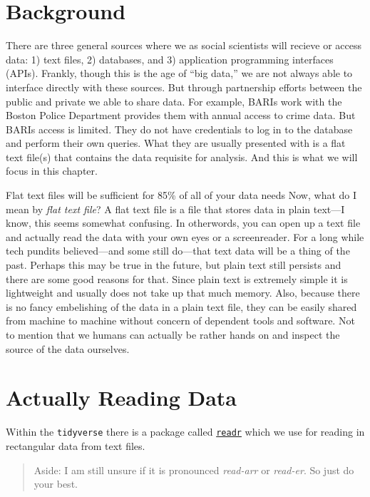 \documentclass[
]{book}
\begin{document}
\hypertarget{background}{%
\section{Background}\label{background}}

There are three general sources where we as social scientists will recieve or access data: 1) text files, 2) databases, and 3) application programming interfaces (APIs). Frankly, though this is the age of ``big data,'' we are not always able to interface directly with these sources. But through partnership efforts between the public and private we able to share data. For example, BARIs work with the Boston Police Department provides them with annual access to crime data. But BARIs access is limited. They do not have credentials to log in to the database and perform their own queries. What they are usually presented with is a flat text file(s) that contains the data requisite for analysis. And this is what we will focus in this chapter.

Flat text files will be sufficient for 85\% of all of your data needs Now, what do I mean by \emph{flat text file}? A flat text file is a file that stores data in plain text---I know, this seems somewhat confusing. In otherwords, you can open up a text file and actually read the data with your own eyes or a screenreader. For a long while tech pundits believed---and some still do---that text data will be a thing of the past. Perhaps this may be true in the future, but plain text still persists and there are some good reasons for that. Since plain text is extremely simple it is lightweight and usually does not take up that much memory. Also, because there is no fancy embelishing of the data in a plain text file, they can be easily shared from machine to machine without concern of dependent tools and software. Not to mention that we humans can actually be rather hands on and inspect the source of the data ourselves.

\hypertarget{actually-reading-data}{%
\section{Actually Reading Data}\label{actually-reading-data}}

Within the \texttt{tidyverse} there is a package called \href{https://readr.tidyverse.org}{\texttt{readr}} which we use for reading in rectangular data from text files.

\begin{quote}
Aside: I am still unsure if it is pronounced \emph{read-arr} or \emph{read-er}. So just do your best.
\end{quote}
\end{document}
